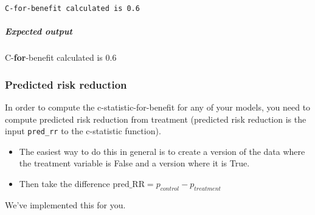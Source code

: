 \documentclass[11pt]{article}
\providecommand{\tightlist}{%
      \setlength{\itemsep}{0pt}\setlength{\parskip}{0pt}}
\newenvironment{Shaded}{}{}
\newcommand{\FloatTok}[1]{\textcolor[rgb]{0.25,0.63,0.44}{{#1}}}
\newcommand{\NormalTok}[1]{{#1}}
\newcommand{\ControlFlowTok}[1]{\textcolor[rgb]{0.00,0.44,0.13}{\textbf{{#1}}}}
\begin{document}
    \begin{Verbatim}[commandchars=\\\{\}]
C-for-benefit calculated is 0.6

    \end{Verbatim}

    \hypertarget{expected-output}{%
\subparagraph{Expected output}\label{expected-output}}

\begin{Shaded}
\begin{Highlighting}[]
\NormalTok{C-}\ControlFlowTok{for}\NormalTok{-benefit calculated is }\FloatTok{0.6}
\end{Highlighting}
\end{Shaded}

    \hypertarget{predicted-risk-reduction}{%
\subsubsection{Predicted risk
reduction}\label{predicted-risk-reduction}}

In order to compute the c-statistic-for-benefit for any of your models,
you need to compute predicted risk reduction from treatment (predicted
risk reduction is the input \texttt{pred\_rr} to the c-statistic
function).

\begin{itemize}
\tightlist
\item
  The easiest way to do this in general is to create a version of the
  data where the treatment variable is False and a version where it is
  True.
\item
  Then take the difference
  \(\text{pred_RR} = p_{control} - p_{treatment}\)
\end{itemize}

We've implemented this for you.
\end{document}
